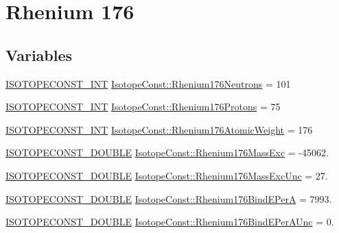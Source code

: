 \hypertarget{group___isotope_const-_rhenium-_re176}{}\section{Rhenium 176}
\label{group___isotope_const-_rhenium-_re176}
\subsection*{Variables}
\begin{DoxyCompactItemize}
\item 
\mbox{\hyperlink{group___isotope_const-_macros_ga5f18360b3e99483a35c32d789e62621c}{I\+S\+O\+T\+O\+P\+E\+C\+O\+N\+S\+T\+\_\+\+I\+NT}} \mbox{\hyperlink{group___isotope_const-_rhenium-_re176_gaf3d60584ae453a8e78d659b92866bf1e}{Isotope\+Const\+::\+Rhenium176\+Neutrons}} = 101
\item 
\mbox{\hyperlink{group___isotope_const-_macros_ga5f18360b3e99483a35c32d789e62621c}{I\+S\+O\+T\+O\+P\+E\+C\+O\+N\+S\+T\+\_\+\+I\+NT}} \mbox{\hyperlink{group___isotope_const-_rhenium-_re176_ga2e0a87d0e60f475b4f17a37c0b3e4520}{Isotope\+Const\+::\+Rhenium176\+Protons}} = 75
\item 
\mbox{\hyperlink{group___isotope_const-_macros_ga5f18360b3e99483a35c32d789e62621c}{I\+S\+O\+T\+O\+P\+E\+C\+O\+N\+S\+T\+\_\+\+I\+NT}} \mbox{\hyperlink{group___isotope_const-_rhenium-_re176_gaad3041fb600f8ca5fc34bb2564c7dce3}{Isotope\+Const\+::\+Rhenium176\+Atomic\+Weight}} = 176
\item 
\mbox{\hyperlink{group___isotope_const-_macros_ga8f45a7272ce02c0b4c65c44636ed719a}{I\+S\+O\+T\+O\+P\+E\+C\+O\+N\+S\+T\+\_\+\+D\+O\+U\+B\+LE}} \mbox{\hyperlink{group___isotope_const-_rhenium-_re176_ga1b0fb55f16ccbbf1f5522bef56bafc0a}{Isotope\+Const\+::\+Rhenium176\+Mass\+Exc}} = -\/45062.
\item 
\mbox{\hyperlink{group___isotope_const-_macros_ga8f45a7272ce02c0b4c65c44636ed719a}{I\+S\+O\+T\+O\+P\+E\+C\+O\+N\+S\+T\+\_\+\+D\+O\+U\+B\+LE}} \mbox{\hyperlink{group___isotope_const-_rhenium-_re176_ga68af55ab3bbe3c642053964315cd9ce1}{Isotope\+Const\+::\+Rhenium176\+Mass\+Exc\+Unc}} = 27.
\item 
\mbox{\hyperlink{group___isotope_const-_macros_ga8f45a7272ce02c0b4c65c44636ed719a}{I\+S\+O\+T\+O\+P\+E\+C\+O\+N\+S\+T\+\_\+\+D\+O\+U\+B\+LE}} \mbox{\hyperlink{group___isotope_const-_rhenium-_re176_ga843d531daeef007f81e1f7c2f5a99b0e}{Isotope\+Const\+::\+Rhenium176\+Bind\+E\+PerA}} = 7993.
\item 
\mbox{\hyperlink{group___isotope_const-_macros_ga8f45a7272ce02c0b4c65c44636ed719a}{I\+S\+O\+T\+O\+P\+E\+C\+O\+N\+S\+T\+\_\+\+D\+O\+U\+B\+LE}} \mbox{\hyperlink{group___isotope_const-_rhenium-_re176_gad83ae4b17dc64f02c3763d9c3210d851}{Isotope\+Const\+::\+Rhenium176\+Bind\+E\+Per\+A\+Unc}} = 0.

\end{DoxyCompactItemize}
